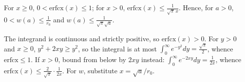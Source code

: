 \begin{lemma}\label{ch2:lem:w}
For $x\ge0$, $0<\mathrm{erfcx}(x)\le1$; for $x>0$, $\mathrm{erfcx}(x)\le\frac1{\sqrt\pi\,x}$. Hence, for $a>0$,
$0<w(a)\le\frac1{r_0}$ and $w(a)\le\frac1{\sqrt\pi\sqrt a}$.
\end{lemma}
\begin{humanproof}
The integrand is continuous and strictly positive, so $\mathrm{erfcx}(x)>0$. For $y>0$ and $x\ge0$,
$y^2+2xy\ge y^2$, so the integral is at most $\int_0^\infty e^{-y^2}dy=\frac{\sqrt\pi}2$, whence $\mathrm{erfcx}\le1$. If
$x>0$, bound from below by $2xy$ instead: $\int_0^\infty e^{-2xy}dy=\frac1{2x}$, whence
$\mathrm{erfcx}(x)\le\frac2{\sqrt\pi}\cdot\frac1{2x}$. For $w$, substitute $x=\sqrt a/r_0$.
\end{humanproof}


